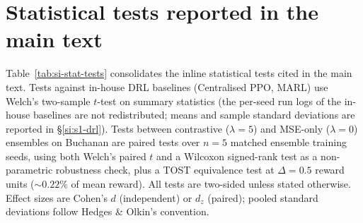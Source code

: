 \documentclass[11pt]{article}
\begin{document}
\section{Statistical tests reported in the main text}\label{si:stat-tests}

Table~\ref{tab:si-stat-tests} consolidates the inline statistical tests cited in the main text. Tests against in-house DRL baselines (Centralised PPO, MARL) use Welch's two-sample $t$-test on summary statistics (the per-seed run logs of the in-house baselines are not redistributed; means and sample standard deviations are reported in \S\ref{si:s1-drl}). Tests between contrastive ($\lambda{=}5$) and MSE-only ($\lambda{=}0$) ensembles on Buchanan are paired tests over $n{=}5$ matched ensemble training seeds, using both Welch's paired $t$ and a Wilcoxon signed-rank test as a non-parametric robustness check, plus a TOST equivalence test at $\Delta = 0.5$ reward units (${\sim}0.22\%$ of mean reward). All tests are two-sided unless stated otherwise. Effect sizes are Cohen's $d$ (independent) or $d_z$ (paired); pooled standard deviations follow Hedges \& Olkin's convention.
\end{document}
